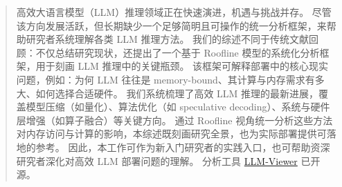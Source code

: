 \begin{abstract}
高效大语言模型（LLM）推理领域正在快速演进，机遇与挑战并存。
尽管该方向发展活跃，但长期缺少一个足够简明且可操作的统一分析框架，来帮助研究者系统理解各类 LLM 推理方法。
我们的综述不同于传统文献回顾：不仅总结研究现状，还提出了一个基于 Roofline 模型的系统化分析框架，用于刻画 LLM 推理中的关键瓶颈。
该框架可解释部署中的核心现实问题，例如：为何 LLM 往往是 memory-bound、其计算与内存需求有多大、如何选择合适硬件。
我们系统梳理了高效 LLM 推理的最新进展，覆盖模型压缩（如量化）、算法优化（如 speculative decoding）、系统与硬件层增强（如算子融合）等关键方向。
通过 Roofline 视角统一分析这些方法对内存访问与计算的影响，本综述既刻画研究全景，也为实际部署提供可落地的参考。
因此，本工作可作为新入门研究者的实践入口，也可帮助资深研究者深化对高效 LLM 部署问题的理解。
分析工具 \href{https://github.com/hahnyuan/LLM-Viewer}{LLM-Viewer} 已开源。
\end{abstract}
